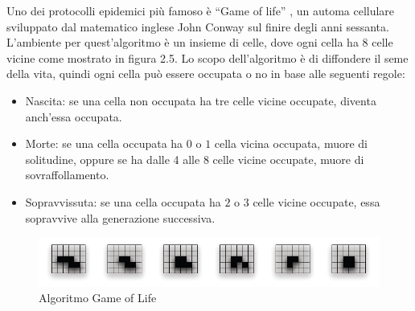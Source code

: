 Uno dei protocolli epidemici più famoso è “Game of life” \cite{gardner1970-gameoflife}, un automa cellulare sviluppato dal matematico inglese John Conway sul finire degli anni sessanta. L'ambiente per quest'algoritmo è un insieme di celle, dove ogni cella ha 8 celle vicine come mostrato in figura 2.5. Lo scopo dell'algoritmo è di diffondere il seme della vita, quindi ogni cella può essere occupata o no in base alle seguenti regole:
\begin{itemize}
	\item Nascita: se una cella non occupata ha tre celle vicine occupate, diventa anch'essa occupata.
	\item Morte: se una cella occupata ha $0$ o $1$ cella vicina occupata, muore di solitudine, oppure se ha dalle 4 alle 8 celle vicine occupate, muore di sovraffollamento.
	\item Sopravvissuta: se una cella occupata ha $2$ o $3$ celle vicine occupate, essa sopravvive alla generazione successiva.
\end{itemize}

\begin{figure}[bh]
\centering
\includegraphics[width=1\linewidth,keepaspectratio]{Images/algoritmi_gossip/game_of_life}
\caption[Algoritmo Game of Life]{Algoritmo Game of Life}
\label{fig:game_of_life}
\end{figure}

